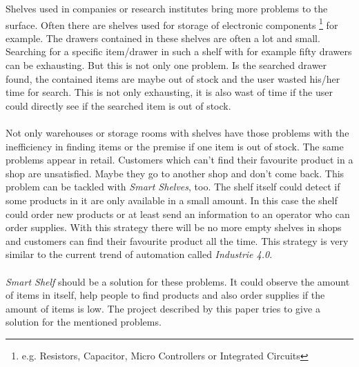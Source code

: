 Shelves used in companies or research institutes bring more problems to the surface. 
Often there are shelves used for storage of electronic components
\footnote{e.g. Resistors, Capacitor, Micro Controllers or Integrated Circuits} for example. 
The drawers contained in these shelves are often a lot and small. 
Searching for a specific item/drawer in such a shelf with for example fifty drawers can be exhausting. 
But this is not only one problem. 
Is the searched drawer found, the contained items are maybe out of stock and the user wasted his/her time for search. 
This is not only exhausting, it is also wast of time if the user could directly see if the searched item is out of stock. 
\\
\\
Not only warehouses or storage rooms with shelves have those problems with the inefficiency in finding items or the premise if one item is out of stock. 
The same problems appear in retail. 
Customers which can't find their favourite product in a shop are unsatisfied. 
Maybe they go to another shop and don't come back. 
This problem can be tackled with \textit{Smart Shelves}, too. 
The shelf itself could detect if some products in it are only available in a small amount. 
In this case the shelf could order new products or at least send an information to an operator who can order supplies. 
With this strategy there will be no more empty shelves in shops and customers can find their favourite product all the time. 
This strategy is very similar to the current trend of automation called \textit{Industrie 4.0}.
\\
\\
\textit{Smart Shelf} should be a solution for these problems. 
It could observe the amount of items in itself, help people to find products and also order supplies if the amount of items is low. 
The project described by this paper tries to give a solution for the mentioned problems. 